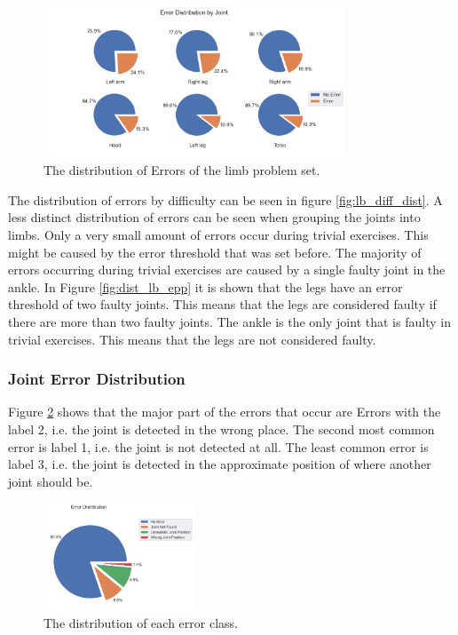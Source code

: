 \begin{figure}[ht]
  \centering
  \includegraphics[width=0.8\textwidth]{figures/Data/dist_limbs/Error_Distribution_by_Joint.png}
  \caption[Error Distribution by Limb]{The distribution of Errors of the limb problem set.}
  \label{fig:lb_pie}
\end{figure}

The distribution of errors by difficulty can be seen in figure \ref{fig:lb_diff_dist}. A less distinct distribution of errors can be seen when grouping the joints into limbs. Only a very small amount of errors occur during trivial exercises. This might be caused by the error threshold that was set before. The majority of errors occurring during trivial exercises are caused by a single faulty joint in the ankle. In Figure \ref{fig:dist_lb_epp} it is shown that the legs have an error threshold of two faulty joints. This means that the legs are considered faulty if there are more than two faulty joints. The ankle is the only joint that is faulty in trivial exercises. This means that the legs are not considered faulty.

\subsubsection{Joint Error Distribution}

Figure \ref{fig:jt_pie} shows that the major part of the errors that occur are Errors with the label 2, i.e. the joint is detected in the wrong place. The second most common error is label 1, i.e. the joint is not detected at all. The least common error is label 3, i.e. the joint is detected in the approximate position of where another joint should be.

\begin{figure}[ht]
  \centering
  \includegraphics[width=0.4\textwidth]{figures/Data/dist_joints/Error_Distribution.png}
  \caption[Error Distribution for each error class]{The distribution of each error class.}
  \label{fig:jt_pie}
\end{figure}

